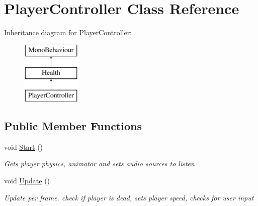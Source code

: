 \hypertarget{classPlayerController}{\section{Player\-Controller Class Reference}
\label{classPlayerController}
}
Inheritance diagram for Player\-Controller\-:\begin{figure}[H]
\begin{center}
\leavevmode
\includegraphics[height=3.000000cm]{classPlayerController}
\end{center}
\end{figure}
\subsection*{Public Member Functions}
\begin{DoxyCompactItemize}
\item 
void \hyperlink{classPlayerController_ae1117d9c4da3193181cddad2c814e467}{Start} ()
\begin{DoxyCompactList}\small\item\em Gets player physics, animator and sets audio sources to listen \end{DoxyCompactList}\item 
void \hyperlink{classPlayerController_ae8bc83dffb99867a04be016473ed2c43}{Update} ()
\begin{DoxyCompactList}\small\item\em Update per frame. check if player is dead, sets player speed, checks for user input \end{DoxyCompactList}\end{DoxyCompactItemize}
